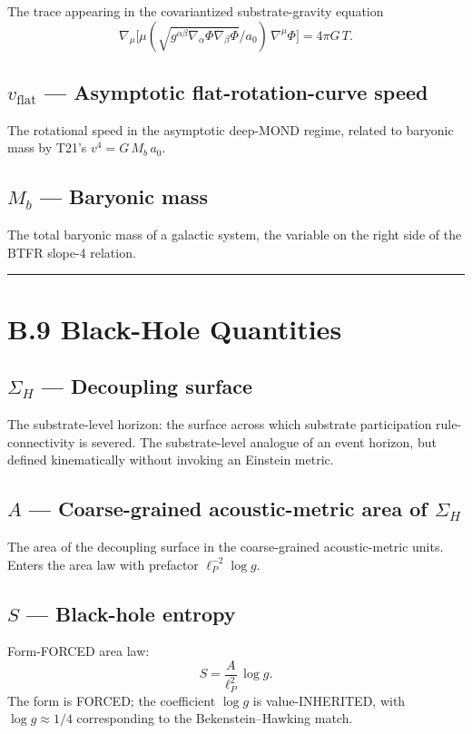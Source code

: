 \documentclass[11pt]{book}
\begin{document}
The trace appearing in the covariantized substrate-gravity equation
\[
\nabla_\mu\big[\mu(\sqrt{g^{\alpha\beta}\nabla_\alpha\Phi\nabla_\beta\Phi}/a_0)\,\nabla^\mu\Phi\big] = 4\pi G\,T.
\]

\subsection{$v_\mathrm{flat}$ — Asymptotic flat-rotation-curve speed}

The rotational speed in the asymptotic deep-MOND regime, related to baryonic mass by T21's $v^4 = G\,M_b\,a_0$.

\subsection{$M_b$ — Baryonic mass}

The total baryonic mass of a galactic system, the variable on the right side of the BTFR slope-4 relation.

\bigskip\hrule\bigskip

\section{B.9 Black-Hole Quantities}

\subsection{$\Sigma_H$ — Decoupling surface}

The substrate-level horizon: the surface across which substrate participation rule-connectivity is severed. The substrate-level analogue of an event horizon, but defined kinematically without invoking an Einstein metric.

\subsection{$A$ — Coarse-grained acoustic-metric area of $\Sigma_H$}

The area of the decoupling surface in the coarse-grained acoustic-metric units. Enters the area law with prefactor $\ell_P^{-2}\log g$.

\subsection{$S$ — Black-hole entropy}

Form-FORCED area law:
\[
S = \frac{A}{\ell_P^2}\,\log g.
\]
The form is FORCED; the coefficient $\log g$ is value-INHERITED, with $\log g \approx 1/4$ corresponding to the Bekenstein–Hawking match.
\end{document}
